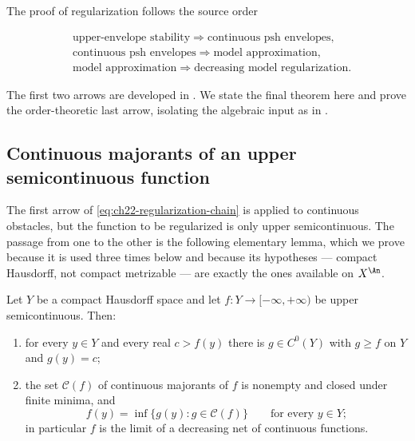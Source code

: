 The proof of regularization follows the source order

\[
 \begin{aligned}
  &\text{upper-envelope stability}
    \Longrightarrow \text{continuous psh envelopes},\\
  &\text{continuous psh envelopes}
    \Longrightarrow \text{model approximation},\\
  &\text{model approximation}
    \Longrightarrow \text{decreasing model regularization}.
 \end{aligned}
\tag{22.73}\label{eq:ch22-regularization-chain}
\]

The first two arrows are developed in .  We state
the final theorem here and prove the order-theoretic last arrow, isolating
the algebraic input as in .

\subsection{Continuous majorants of an upper semicontinuous function}

The first arrow of \eqref{eq:ch22-regularization-chain} is applied to
continuous obstacles, but the function to be regularized is only upper
semicontinuous.  The passage from one to the other is the following
elementary lemma, which we prove because it is used three times below and
because its hypotheses --- compact Hausdorff, not compact metrizable --- are
exactly the ones available on $X^{\An}$.

\begin{lemma}
\label{lem:ch22-continuous-majorant}
Let $Y$ be a compact Hausdorff space and let
$f:Y\to[-\infty,+\infty)$ be upper semicontinuous.  Then:
\begin{enumerate}
\item\label{itm:ch22-maj:point} for every $y\in Y$ and every real
$c>f(y)$ there is $g\in C^0(Y)$ with $g\geq f$ on $Y$ and
$g(y)=c$;
\item\label{itm:ch22-maj:inf} the set $\mathcal C(f)$ of continuous
majorants of $f$ is nonempty and closed under finite minima, and
\[
 f(y)=\inf\{g(y):g\in\mathcal C(f)\}
 \qquad\text{for every }y\in Y;
\tag{22.74}\label{eq:ch22-continuous-majorant-inf}
\]
in particular $f$ is the limit of a decreasing net of continuous
functions.
\end{enumerate}
\end{lemma}

